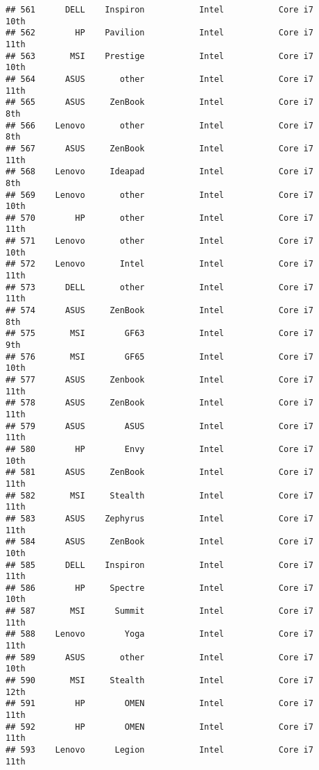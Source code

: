 \documentclass[
]{article}
\begin{document}
\begin{verbatim}
## 561      DELL    Inspiron           Intel           Core i7            10th
## 562        HP    Pavilion           Intel           Core i7            11th
## 563       MSI    Prestige           Intel           Core i7            10th
## 564      ASUS       other           Intel           Core i7            11th
## 565      ASUS     ZenBook           Intel           Core i7             8th
## 566    Lenovo       other           Intel           Core i7             8th
## 567      ASUS     ZenBook           Intel           Core i7            11th
## 568    Lenovo     Ideapad           Intel           Core i7             8th
## 569    Lenovo       other           Intel           Core i7            10th
## 570        HP       other           Intel           Core i7            11th
## 571    Lenovo       other           Intel           Core i7            10th
## 572    Lenovo       Intel           Intel           Core i7            11th
## 573      DELL       other           Intel           Core i7            11th
## 574      ASUS     ZenBook           Intel           Core i7             8th
## 575       MSI        GF63           Intel           Core i7             9th
## 576       MSI        GF65           Intel           Core i7            10th
## 577      ASUS     Zenbook           Intel           Core i7            11th
## 578      ASUS     ZenBook           Intel           Core i7            11th
## 579      ASUS        ASUS           Intel           Core i7            11th
## 580        HP        Envy           Intel           Core i7            10th
## 581      ASUS     ZenBook           Intel           Core i7            11th
## 582       MSI     Stealth           Intel           Core i7            11th
## 583      ASUS    Zephyrus           Intel           Core i7            11th
## 584      ASUS     ZenBook           Intel           Core i7            10th
## 585      DELL    Inspiron           Intel           Core i7            11th
## 586        HP     Spectre           Intel           Core i7            10th
## 587       MSI      Summit           Intel           Core i7            11th
## 588    Lenovo        Yoga           Intel           Core i7            11th
## 589      ASUS       other           Intel           Core i7            10th
## 590       MSI     Stealth           Intel           Core i7            12th
## 591        HP        OMEN           Intel           Core i7            11th
## 592        HP        OMEN           Intel           Core i7            11th
## 593    Lenovo      Legion           Intel           Core i7            11th

\end{verbatim}
\end{document}
